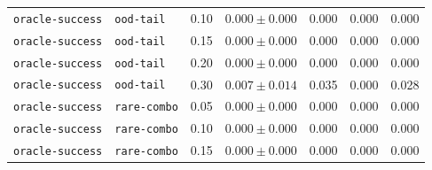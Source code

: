 \documentclass{article}
\begin{document}
\begin{center}
\begin{tabular}{lllcccc}
\texttt{oracle-success} & \texttt{ood-tail} & 0.10 & $0.000 \pm 0.000$ & 0.000 & 0.000 & 0.000 \\
\texttt{oracle-success} & \texttt{ood-tail} & 0.15 & $0.000 \pm 0.000$ & 0.000 & 0.000 & 0.000 \\
\texttt{oracle-success} & \texttt{ood-tail} & 0.20 & $0.000 \pm 0.000$ & 0.000 & 0.000 & 0.000 \\
\texttt{oracle-success} & \texttt{ood-tail} & 0.30 & $0.007 \pm 0.014$ & 0.035 & 0.000 & 0.028 \\
\texttt{oracle-success} & \texttt{rare-combo} & 0.05 & $0.000 \pm 0.000$ & 0.000 & 0.000 & 0.000 \\
\texttt{oracle-success} & \texttt{rare-combo} & 0.10 & $0.000 \pm 0.000$ & 0.000 & 0.000 & 0.000 \\
\texttt{oracle-success} & \texttt{rare-combo} & 0.15 & $0.000 \pm 0.000$ & 0.000 & 0.000 & 0.000 \\
\bottomrule
\end{tabular}
\end{center}
\end{document}
